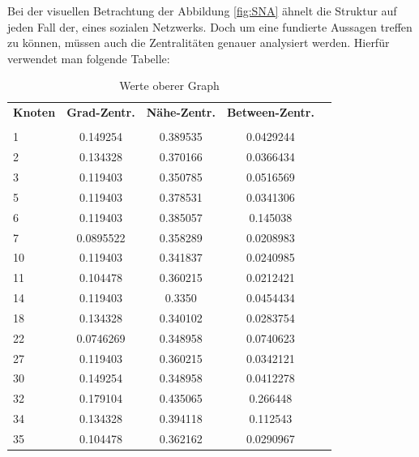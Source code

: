 \FloatBarrier

Bei der visuellen Betrachtung der Abbildung \ref{fig:SNA} ähnelt die Struktur auf jeden Fall der, eines sozialen Netzwerks. Doch um eine fundierte Aussagen treffen zu können, müssen auch die Zentralitäten genauer analysiert werden. Hierfür verwendet man folgende Tabelle:

\begin{table}[h!]
\footnotesize
\caption{Werte oberer Graph}
\begin{tabular}{lcccc}\toprule 
\textbf{Knoten} &\textbf{Grad-Zentr.} &\textbf{Nähe-Zentr.}  &\textbf{Between-Zentr.} \\
 &\\\midrule
  1 & 0.149254  & 0.389535 & 0.0429244   \\
  2 & 0.134328  & 0.370166 & 0.0366434   \\
  3 & 0.119403  & 0.350785 & 0.0516569   \\
  5 & 0.119403  & 0.378531 & 0.0341306   \\
  6 & 0.119403  & 0.385057 & 0.145038    \\
  7 & 0.0895522 & 0.358289 & 0.0208983   \\
 10 & 0.119403  & 0.341837 & 0.0240985   \\
 11 & 0.104478  & 0.360215 & 0.0212421   \\
 14 & 0.119403  & 0.3350    & 0.0454434   \\
 18 & 0.134328  & 0.340102 & 0.0283754   \\
 22 & 0.0746269 & 0.348958 & 0.0740623   \\
 27 & 0.119403  & 0.360215 & 0.0342121   \\
 30 & 0.149254  & 0.348958 & 0.0412278   \\
 32 & 0.179104  & 0.435065 & 0.266448    \\
 34 & 0.134328  & 0.394118 & 0.112543    \\
 35 & 0.104478  & 0.362162 & 0.0290967   \\
       

\end{tabular}
\end{table}
